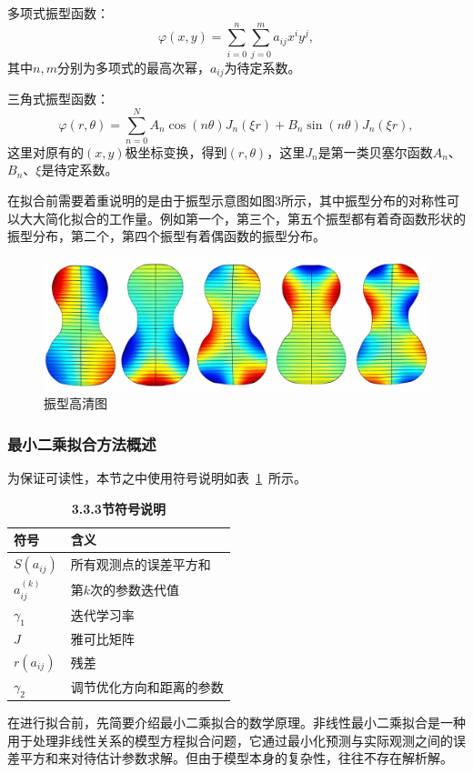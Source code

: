 \documentclass[withoutpreface,bwprint]{cumcmthesis} %
\begin{document}
多项式振型函数：
\begin{equation}  \varphi\left(x,y\right)=\sum_{i=0}^n\sum_{j=0}^ma_{ij}x^iy^j, \label{34}
\end{equation}
其中$n,m$分别为多项式的最高次幂，$a_{ij}$为待定系数。

三角式振型函数：
\begin{equation}
    \varphi\left(r,\theta\right)=\sum_{n=0}^N A_n \cos\left(n\theta\right)J_n\left(\xi r\right)+B_n\sin\left(n\theta\right)J_n\left(\xi r\right),\label{35}
\end{equation}
这里对原有的$(x,y)$极坐标变换，得到$(r,\theta)$，这里$J_n$是第一类贝塞尔函数$A_n$、$B_n$、$\xi$是待定系数。

在拟合前需要着重说明的是由于振型示意图如图3所示，其中振型分布的对称性可以大大简化拟合的工作量。例如第一个，第三个，第五个振型都有着奇函数形状的振型分布，第二个，第四个振型有着偶函数的振型分布。
\begin{figure}[H]
\includegraphics[width=1\linewidth]{CUMCMThesis-master/figures/gaoqing.png}\caption{振型高清图}
\label{fig}
\end{figure}

\subsubsection{最小二乘拟合方法概述}
为保证可读性，本节之中使用符号说明如表~\ref{table-7}~所示。
\begin{table}[H]
	\caption{\textbf{3.3.3节符号说明}}%
	\centering
	\begin{tabular}{ll}%
		\hline %
		符号   &  含义  \\
		\hline %
		$S\left(a_{ij}\right)$&所有观测点的误差平方和\\
		$a_{ij}^{(k)}$&第$k$次的参数迭代值\\
		$\gamma_1$&迭代学习率\\
		$J$&雅可比矩阵\\
		$r\left(a_{ij}\right)$&残差\\
		$\gamma_2$&调节优化方向和距离的参数\\
		\hline %
	\end{tabular}\label{table-7}
\end{table}
在进行拟合前，先简要介绍最小二乘拟合的数学原理。非线性最小二乘拟合是一种用于处理非线性关系的模型方程拟合问题，它通过最小化预测与实际观测之间的误差平方和来对待估计参数求解。但由于模型本身的复杂性，往往不存在解析解。
\end{document}
